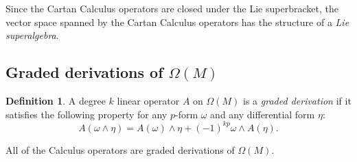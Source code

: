 \documentclass{article}
\theoremstyle{definition}
\newtheorem{dfn}[thm]{Definition}
\theoremstyle{remark}
\begin{document}
Since the Cartan Calculus operators are closed under the Lie superbracket, the vector space spanned by the Cartan Calculus operators has the structure of a \emph{Lie superalgebra}.

\subsection*{Graded derivations of $\Omega(M)$}
\begin{dfn}
A degree $k$ linear operator $A$ on $\Omega(M)$ is a \emph{graded derivation} if it satisfies the following property for any $p$-form $\omega$ and any differential form $\eta$:
\begin{equation}
A (\omega \wedge \eta) = A(\omega) \wedge \eta + (-1)^{kp} \omega \wedge A(\eta).
\end{equation}
\end{dfn}

All of the Calculus operators are graded derivations of $\Omega(M)$.
\end{document}
